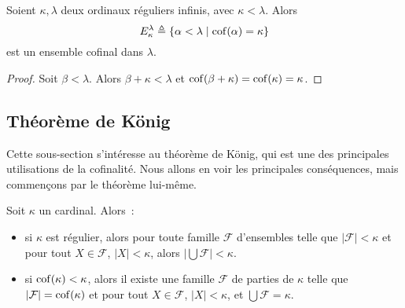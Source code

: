 \begin{proposition}
  Soient $\kappa, \lambda$ deux ordinaux réguliers infinis, avec
  $\kappa < \lambda$. Alors
  \[E_\kappa^\lambda \triangleq \{\alpha < \lambda \mid \operatorname{cof}(\alpha) = \kappa\}\]
  est un ensemble cofinal dans $\lambda$.
\end{proposition}

\begin{proof}
  Soit $\beta < \lambda$. Alors $\beta + \kappa < \lambda$ et
  $\operatorname{cof}(\beta + \kappa) = \operatorname{cof}(\kappa) = \kappa$.
\end{proof}

\subsection{Théorème de König}

Cette sous-section s'intéresse au théorème de König, qui est une des principales
utilisations de la cofinalité. Nous allons en voir les principales conséquences,
mais commençons par le théorème lui-même.

\begin{theorem}\label{thm.Konig}
  Soit $\kappa$ un cardinal. Alors~:
  \begin{itemize}
  \item si $\kappa$ est régulier, alors pour toute famille $\mathcal F$
    d'ensembles telle que $|\mathcal F| < \kappa$ et pour tout $X\in\mathcal F$,
    $|X| < \kappa$, alors $\displaystyle\Big|\bigcup \mathcal F\Big| < \kappa$.
  \item si $\operatorname{cof}(\kappa) < \kappa$, alors il existe une famille $\mathcal F$
    de parties de $\kappa$ telle que $|\mathcal F| = \operatorname{cof}(\kappa)$ et pour tout
    $X\in\mathcal F$, $|X|<\kappa$, et $\displaystyle\bigcup\mathcal F =\kappa$.
  \end{itemize}
\end{theorem}

